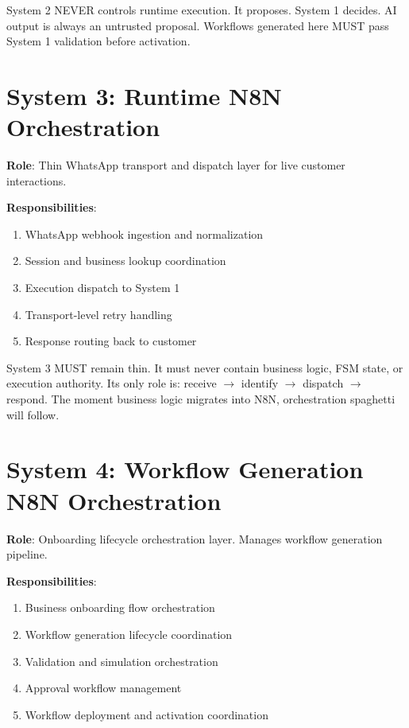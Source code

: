 \documentclass[12pt, a4paper]{report}
\newenvironment{invariantbox}[1]{%
  \begin{tcolorbox}[
    colback=red!4!white,
    colframe=warningred,
    title={\textbf{INVARIANT: #1}},
    fonttitle=\small\bfseries
  ]
}{%
  \end{tcolorbox}
}
\newenvironment{warningbox}{%
  \begin{tcolorbox}[
    colback=yellow!10!white,
    colframe=orange!80!black,
    title={\textbf{ARCHITECTURAL WARNING}},
    fonttitle=\small\bfseries
  ]
}{%
  \end{tcolorbox}
}
\begin{document}
\begin{invariantbox}{System 2 Constraint}
System 2 NEVER controls runtime execution. It proposes. System 1 decides. AI output is always an untrusted proposal. Workflows generated here MUST pass System 1 validation before activation.
\end{invariantbox}

\section{System 3: Runtime N8N Orchestration}

\textbf{Role}: Thin WhatsApp transport and dispatch layer for live customer interactions.

\textbf{Responsibilities}:
\begin{enumerate}
  \item WhatsApp webhook ingestion and normalization
  \item Session and business lookup coordination
  \item Execution dispatch to System 1
  \item Transport-level retry handling
  \item Response routing back to customer
\end{enumerate}

\begin{warningbox}
System 3 MUST remain thin. It must never contain business logic, FSM state, or execution authority. Its only role is: receive $\to$ identify $\to$ dispatch $\to$ respond. The moment business logic migrates into N8N, orchestration spaghetti will follow.
\end{warningbox}

\section{System 4: Workflow Generation N8N Orchestration}

\textbf{Role}: Onboarding lifecycle orchestration layer. Manages workflow generation pipeline.

\textbf{Responsibilities}:
\begin{enumerate}
  \item Business onboarding flow orchestration
  \item Workflow generation lifecycle coordination
  \item Validation and simulation orchestration
  \item Approval workflow management
  \item Workflow deployment and activation coordination
\end{enumerate}
\end{document}
